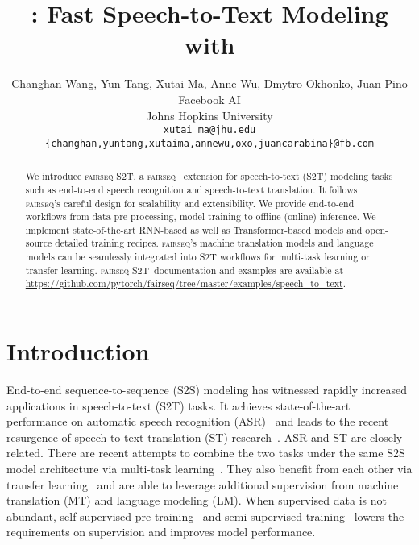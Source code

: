\documentclass[11pt,a4paper]{article}
\title{\stot: Fast Speech-to-Text Modeling with \fairseq}
\author{Changhan Wang, Yun Tang, Xutai Ma, Anne Wu, Dmytro Okhonko, Juan Pino \vspace*{0.2cm} \\
Facebook AI \\
Johns Hopkins University \vspace*{0.2cm} \\
  {\tt xutai\_\thinspace ma@jhu.edu} \\
\texttt{\{changhan,yuntang,xutaima,annewu,oxo,juancarabina\}@fb.com} \\
}
\date{}
\newcommand{\fairseq}{\textsc{fairseq}}
\newcommand{\stot}{\textsc{fairseq S2T}}
\begin{document}
\maketitle
\begin{abstract}
We introduce \stot, a \fairseq~\citep{ott2019fairseq} extension for speech-to-text (S2T) modeling tasks such as end-to-end speech recognition and speech-to-text translation. It follows \fairseq's careful design for scalability and extensibility. We provide end-to-end workflows from data pre-processing, model training to offline (online) inference. We implement state-of-the-art RNN-based as well as Transformer-based models and open-source detailed training recipes. \fairseq's machine translation models and language models can be seamlessly integrated into S2T workflows for multi-task learning or transfer learning. \stot~documentation and examples are available at \url{https://github.com/pytorch/fairseq/tree/master/examples/speech_to_text}.
\end{abstract}

\section{Introduction}


End-to-end sequence-to-sequence (S2S) modeling has witnessed rapidly increased applications in speech-to-text (S2T) tasks. It achieves state-of-the-art performance on automatic speech recognition (ASR)~\citep{park2019specaugment,synnaeve2019end} and leads to the recent resurgence of speech-to-text translation (ST) research~\citep{duong2016attentional,berard2016listen}. ASR and ST are closely related. There are recent attempts to combine the two tasks under the same S2S model architecture via multi-task learning~\citep{anastasopoulos2018tied,liu2019synchronous}. They also benefit from each other via transfer learning~\citep{bansal2018pre,wang2020improving} and are able to leverage additional supervision from machine translation (MT) and language modeling (LM). When supervised data is not abundant, self-supervised pre-training~\citep{Schneider2019,wu2020selfsupervised} and semi-supervised training~\citep{Kahn2020SelfTrainingFE,pino2020selftraining} lowers the requirements on supervision and improves model performance.
\end{document}
